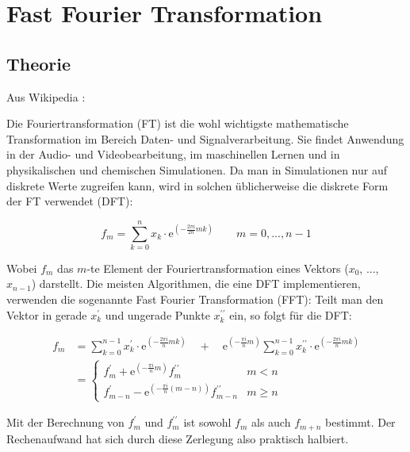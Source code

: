 
	\section{Fast Fourier Transformation}
		\subsection{Theorie}
		Aus Wikipedia \autocite{wikiFFT}:
		
		Die Fouriertransformation (FT) ist die wohl wichtigste mathematische Transformation im Bereich Daten- und Signalverarbeitung. Sie findet Anwendung in der Audio- und Videobearbeitung, im maschinellen Lernen und in physikalischen und chemischen Simulationen. Da man in Simulationen nur auf diskrete Werte zugreifen kann, wird in solchen üblicherweise die diskrete Form der FT verwendet (DFT):
		
		\begin{equation}
		f_m = \sum^n_{k=0}x_k\cdot\mathrm{e}^{\left(-\frac{2\pi i}{2n}mk\right)}\qquad m=0,...,n-1
		\end{equation}
		
		Wobei $f_m$ das $m$-te Element der Fouriertransformation eines Vektors ($x_0$, ..., $x_{n-1}$) darstellt. Die meisten Algorithmen, die eine DFT implementieren, verwenden die sogenannte Fast Fourier Transformation (FFT): Teilt man den Vektor in gerade $x^{\prime}_k$ und ungerade Punkte $x^{\prime\prime}_k$ ein, so folgt für die DFT:
		
		\begin{align}
		f_m &= \sum_{k=0}^{n-1}x^{\prime}_k\cdot\mathrm{e}^{\left(-\frac{2\pi i}{n}mk\right)} \quad + \quad \mathrm{e}^{\left(-\frac{\pi i}{n}m\right)}\sum_{k=0}^{n-1}x^{\prime\prime}_k\cdot\mathrm{e}^{\left(-\frac{2\pi i}{n}mk\right)} \\
		&= \begin{cases} 
		f^{\prime}_m     + \mathrm{e}^{\left(-\frac{\pi i}{n}m\right)}    f^{\prime\prime}_m     & m < n \\
		f^{\prime}_{m-n} - \mathrm{e}^{\left(-\frac{\pi i}{n}(m-n)\right)}f^{\prime\prime}_{m-n} & m \geq n 
		\end{cases}
		\end{align}
		
		Mit der Berechnung von $f^{\prime}_m$ und $f^{\prime\prime}_m$ ist sowohl $f_m$ als auch $f_{m+n}$ bestimmt. Der Rechenaufwand hat sich durch diese Zerlegung also praktisch halbiert. 
		

